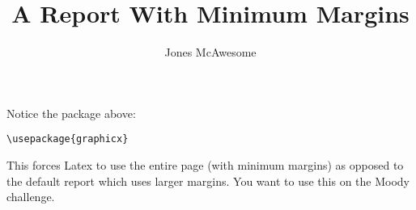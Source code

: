 \documentclass{report}
\title{A Report With Minimum Margins}
\author{Jones McAwesome}
\begin{document}
Notice the package above: 

\begin{verbatim}\usepackage{graphicx}\end{verbatim}

This forces Latex to use the entire page (with minimum margins) as opposed to the default report which uses larger margins. You want to use this on the Moody challenge. 
\end{document}
